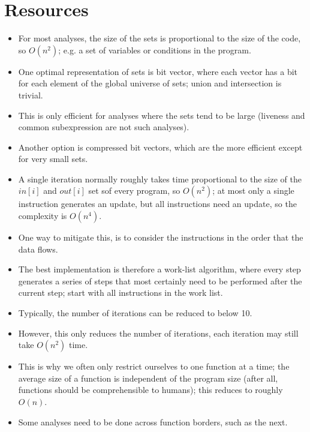\section{Resources}

\begin{itemize}

\item For most analyses, the size of the sets is proportional to the size of
the code, so $O(n^2)$; e.g. a set of variables or conditions in the program.

\item One optimal representation of sets is bit vector, where each vector has a
bit for each element of the global universe of sets; union and intersection is
trivial.

\item This is only efficient for analyses where the sets tend to be large
(liveness and common subexpression are not such analyses).

\item Another option is compressed bit vectors, which are the more efficient
except for very small sets.

\item A single iteration normally roughly takes time proportional to the size
of the $in[i]$ and $out[i]$ set sof every program, so $O(n^2)$; at most only a
single instruction generates an update, but all instructions need an update, so
the complexity is $O(n^4)$.

\item One way to mitigate this, is to consider the instructions in the order
that the data flows.

\item The best implementation is therefore a work-list algorithm, where every
step generates a series of steps that most certainly need to be performed after
the current step; start with all instructions in the work list.

\item Typically, the number of iterations can be reduced to below 10.

\item However, this only reduces the number of iterations, each iteration may
still take $O(n^2)$ time.

\item This is why we often only restrict ourselves to one function at a time;
the average size of a function is independent of the program size (after all,
functions should be comprehensible to humans); this reduces to roughly $O(n)$. 

\item Some analyses need to be done across function borders, such as the next.

\end{itemize}

